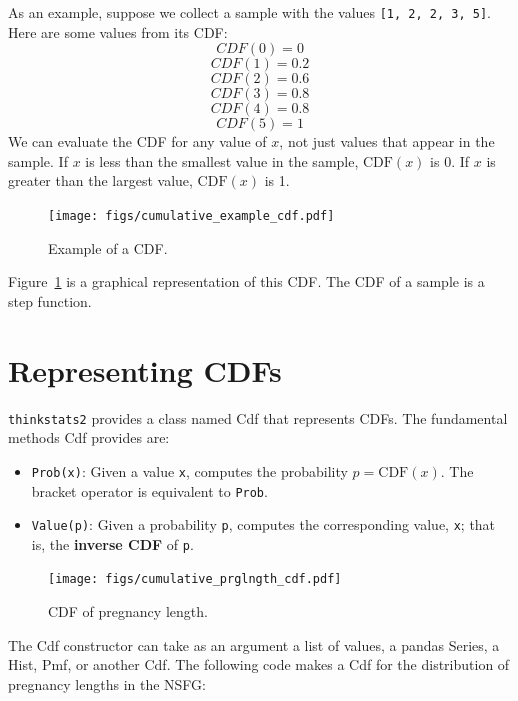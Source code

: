 \documentclass[12pt]{book}
\newcommand{\CDF}{\mathrm{CDF}}
\theoremstyle{exercise}
\begin{document}
As an example, suppose we collect a sample with the values 
{\tt [1, 2, 2, 3, 5]}.  Here are some values from its CDF:
%
\[ CDF(0) = 0 \]
%
\[ CDF(1) = 0.2\]
%
\[ CDF(2) = 0.6\]
%
\[ CDF(3) = 0.8\]
%
\[ CDF(4) = 0.8\]
%
\[ CDF(5) = 1\]
%
We can evaluate the CDF for any value of $x$, not just
values that appear in the sample.
If $x$ is less than the smallest value in the sample, $\CDF(x)$ is 0.
If $x$ is greater than the largest value, $\CDF(x)$ is 1.

\begin{figure}
\centerline{\texttt{[image: figs/cumulative\_example\_cdf.pdf]}}
\caption{Example of a CDF.}%
\label{example_cdf}
\end{figure}

Figure~\ref{example_cdf} is a graphical representation of this CDF.
The CDF of a sample is a step function.%


\section{Representing CDFs}%

{\tt thinkstats2} provides a class named Cdf that represents
CDFs.  The fundamental methods Cdf provides are:

\begin{itemize}

\item {\tt Prob(x)}: Given a value {\tt x}, computes the probability
  $p = \CDF(x)$.  The bracket operator is equivalent to {\tt Prob}.%

\item {\tt Value(p)}: Given a probability {\tt p}, computes the
corresponding value, {\tt x}; that is, the {\bf inverse CDF} of {\tt p}.%
%

\end{itemize}

\begin{figure}
\centerline{\texttt{[image: figs/cumulative\_prglngth\_cdf.pdf]}}
\caption{CDF of pregnancy length.}%
\label{cumulative_prglngth_cdf}
\end{figure}

The Cdf constructor can take as an argument a list of values,
a pandas Series, a Hist, Pmf, or another Cdf.  The following
code makes a Cdf for the distribution of pregnancy lengths in
the NSFG:%
%
\end{document}
